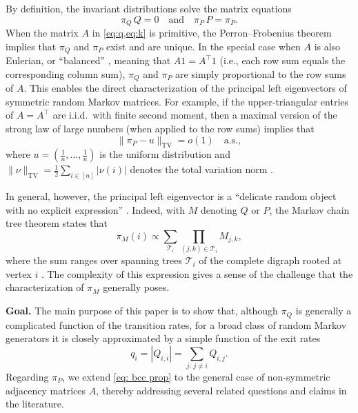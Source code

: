 \documentclass[12pt]{amsart}
\DeclareMathOperator{\1}{\mathbf{1}}
\begin{document}
By definition, the invariant distributions solve the matrix equations
\begin{equation*}%
\pi_Q \, Q = 0 \quad \text{and} \quad \pi_P \, P = \pi_P.
\end{equation*}
When the matrix $A$ in \cref{eq:q,eq:k} is primitive, the Perron--Frobenius theorem implies that $\pi_Q$ and $\pi_P$ exist and are unique. In the special case when $A$ is also Eulerian, or ``balanced'' \cite{MR3730470}, meaning that $A1 = A^\top 1$ (i.e., each row sum equals the corresponding column sum), $\pi_Q$ and $\pi_P$ are simply proportional to the row sums of $A$. This enables the direct characterization of the principal left eigenvectors of symmetric random Markov matrices. For example, if the upper-triangular entries of $A = A^\top$ are i.i.d.\ with finite second moment, then a maximal version of the strong law of large numbers (when applied to the row sums) implies that
\begin{equation}\label{eq: bcc prop}
\| \pi_P - u \|_{\mathrm{TV}} = o(1) \quad \mathrm{a.s.},
\end{equation}
where $u = (\frac1n, \dots, \frac1n)$ is the uniform distribution and $\|\nu\|_{\mathrm{TV}} = \frac12 \sum_{i \in [n]} |\nu (i)|$ denotes the total variation norm \cite[Proposition 1.5]{MR2644041}.

In general, however, the principal left eigenvector is a ``delicate random object with no explicit expression'' \cite{MR3916108}. Indeed, with $M$ denoting $Q$ or $P$, the Markov chain tree theorem states that
\begin{equation*}%
\pi_M (i) \propto \sum_{\mathcal{T}_i} \prod_{(j,k) \in \mathcal{T}_i} M_{j,k},
\end{equation*}
where the sum ranges over spanning trees $\mathcal{T}_i$ of the complete digraph rooted at vertex $i$ \cite{MR734725}. The complexity of this expression gives a sense of the challenge that the characterization of $\pi_M$ generally poses.

\medskip\noindent
{\bf Goal.} The main purpose of this paper is to show that, although $\pi_Q$ is generally a complicated function of the transition rates, for a broad class of random Markov generators it is closely approximated by a simple function of the exit rates
\begin{equation*}%
q_i = |Q_{i,i}| = \sum_{j:\, j \neq i} Q_{i,j}.
\end{equation*}
Regarding $\pi_P$, we extend \cref{eq: bcc prop} to the general case of non-symmetric adjacency matrices $A$, thereby addressing several related questions and claims in the literature.
\end{document}
